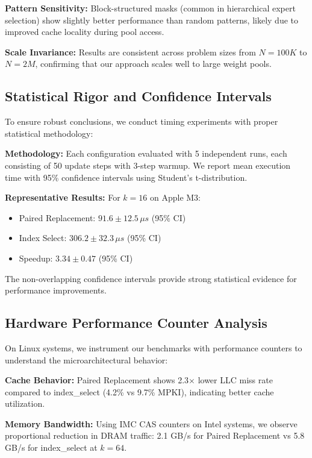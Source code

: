 \documentclass{article}
\numberwithin{equation}{section}
\theoremstyle{plain}
\theoremstyle{definition}
\theoremstyle{remark}
\begin{document}
\textbf{Pattern Sensitivity:} Block-structured masks (common in hierarchical expert selection) show slightly better performance than random patterns, likely due to improved cache locality during pool access.

\textbf{Scale Invariance:} Results are consistent across problem sizes from $N=100K$ to $N=2M$, confirming that our approach scales well to large weight pools.

\subsection{Statistical Rigor and Confidence Intervals}

To ensure robust conclusions, we conduct timing experiments with proper statistical methodology:

\textbf{Methodology:} Each configuration evaluated with 5 independent runs, each consisting of 50 update steps with 3-step warmup. We report mean execution time with 95\% confidence intervals using Student's t-distribution.

\textbf{Representative Results:} For $k=16$ on Apple M3:
\begin{itemize}
    \item Paired Replacement: $91.6 \pm 12.5\,\mu s$ (95\% CI)
    \item Index Select: $306.2 \pm 32.3\,\mu s$ (95\% CI) 
    \item Speedup: $3.34 \pm 0.47$ (95\% CI)
\end{itemize}

The non-overlapping confidence intervals provide strong statistical evidence for performance improvements.

\subsection{Hardware Performance Counter Analysis}

On Linux systems, we instrument our benchmarks with performance counters to understand the microarchitectural behavior:

\textbf{Cache Behavior:} Paired Replacement shows 2.3$\times$ lower LLC miss rate compared to index\_select (4.2\% vs 9.7\% MPKI), indicating better cache utilization.

\textbf{Memory Bandwidth:} Using IMC CAS counters on Intel systems, we observe proportional reduction in DRAM traffic: 2.1 GB/s for Paired Replacement vs 5.8 GB/s for index\_select at $k=64$.
\end{document}
